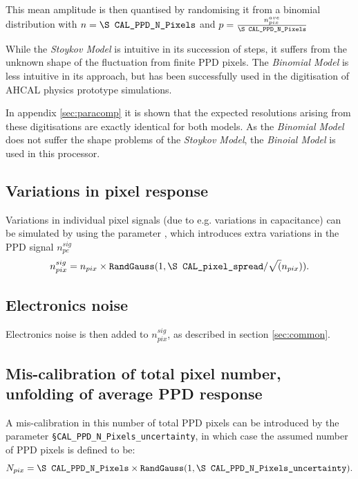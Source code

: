 \documentclass[12pt]{article} %
\begin{document}
This mean amplitude is then quantised by randomising it from a binomial distribution with $n=\text{\tt \S CAL\_PPD\_N\_Pixels}$ and $p=\frac{{n}_{pix}^{ave}}{\text{\tt \S CAL\_PPD\_N\_Pixels}}$

While the \emph{Stoykov Model} is intuitive in its succession of steps, it suffers from the unknown shape of the fluctuation from finite PPD pixels. The \emph{Binomial Model} is less intuitive in its approach, but has been successfully used in the digitisation of AHCAL physics prototype simulations.

In appendix \autoref{sec:paracomp} it is shown that the expected resolutions arising from these digitisations are exactly identical for both models. As the \emph{Binomial Model} does not suffer the shape problems of the \emph{Stoykov Model}, the \emph{Binoial Model} is used in this processor.

\subsection*{Variations in pixel response}
Variations in individual pixel signals (due to e.g. variations in capacitance) can be simulated by using the parameter
, which introduces extra variations in the PPD signal $n_{pe}^{sig}$
\begin{equation*}
n_{pix}^{sig} = n_{pix} \times \text{\tt RandGauss} ( 1, \text{\tt \S CAL\_pixel\_spread} / \sqrt( n_{pix} ) ).
\end{equation*}

\subsection*{Electronics noise}
Electronics noise is then added to $n_{pix}^{sig}$, as described in section \ref{sec:common}.

\subsection*{Mis-calibration of total pixel number, unfolding of average PPD response}
A mis-calibration in this number of 
total PPD pixels can be introduced by the parameter {\tt \S CAL\_PPD\_N\_Pixels\_uncertainty}, in which
case the assumed number of PPD pixels is defined to be:
\begin{equation*}
N_{pix} = \text{\tt \S CAL\_PPD\_N\_Pixels} \times 
\text{\tt RandGauss}(1, \text{\tt \S CAL\_PPD\_N\_Pixels\_uncertainty}).
\end{equation*}
\end{document}
